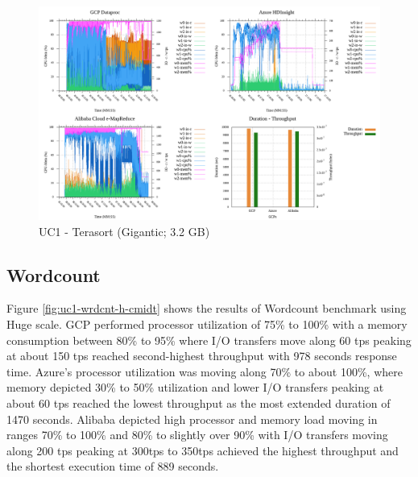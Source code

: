 \documentclass[review]{elsarticle}
\begin{document}
\begin{figure}[p]
	\caption{UC1 - Terasort (Gigantic; 3.2 GB)}
	\label{fig:uc1-tera-g-cmidt}
	\includegraphics[width=\textwidth]{uc1-tera-g-cmidt}
	\centering
\end{figure}

\subsection{Wordcount}
Figure \ref{fig:uc1-wrdcnt-h-cmidt} shows the results of Wordcount benchmark using Huge scale.
GCP performed processor utilization of 75\% to 100\% with a memory consumption between 80\% to 95\% where I/O transfers move along 60 tps peaking at about 150 tps reached second-highest throughput with 978 seconds response time. Azure's processor utilization was moving along 70\% to about 100\%, where memory depicted 30\% to 50\% utilization and lower I/O transfers peaking at about 60 tps reached the lowest throughput as the most extended duration of 1470 seconds. Alibaba depicted high processor and memory load moving in ranges 70\% to 100\% and 80\% to slightly over 90\% with I/O transfers moving along 200 tps peaking at 300tps to 350tps achieved the highest throughput and the shortest execution time of 889 seconds.
\end{document}
